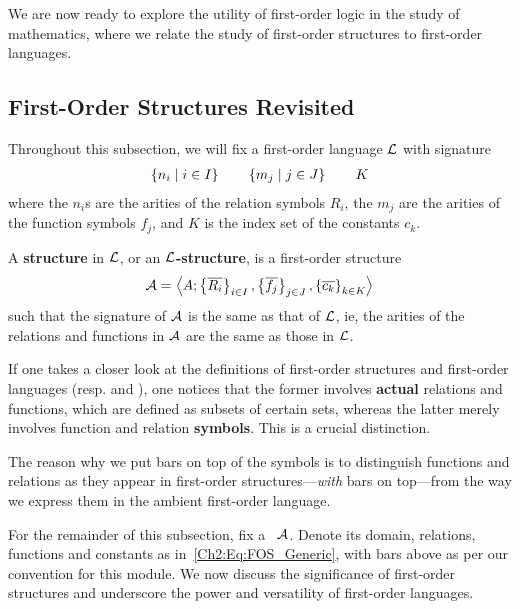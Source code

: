 We are now ready to explore the utility of first-order logic in the study of mathematics, where we relate the study of first-order structures to first-order languages.

\subsection{First-Order Structures Revisited}

Throughout this subsection, we will fix a first-order language $\mathcal{L}$ with signature
\begin{align*}
    \left\{ n_i \; \middle\vert \; i \in I \right\}
    \qquad
    \left\{ m_j \; \middle\vert \; j \in J \right\}
    \qquad
    K
\end{align*}
where the $n_i$s are the arities of the relation symbols $R_i$, the $m_j$ are the arities of the function symbols $f_j$, and $K$ is the index set of the constants $c_k$.

\begin{boxdefinition}\label{Ch2:Def:First-Order_Structure_in_First-Order_Language}
    A \textbf{structure} in $\mathcal{L}$, or an \textbf{$\mathcal{L}$-structure}, is a first-order structure
    \begin{align}
        \mathcal{A} = \left\langle A; \left\{ \overline{R_i} \right\}_{i \in I}, \left\{ \overline{f_j} \right\}_{j \in J}, \left\{ \overline{c_k} \right\}_{k \in K} \right\rangle
        \label{Ch2:Eq:FOS_Generic}
    \end{align}
    such that the signature of $\mathcal{A}$ is the same as that of $\mathcal{L}$, ie, the arities of the relations and functions in $\mathcal{A}$ are the same as those in $\mathcal{L}$.
\end{boxdefinition}

If one takes a closer look at the definitions of first-order structures and first-order languages (resp.  and ), one notices that the former involves \textbf{actual} relations and functions, which are defined as subsets of certain sets, whereas the latter merely involves function and relation \textbf{symbols}. This is a crucial distinction.

\begin{boxconvention}
    The reason why we put bars on top of the symbols is to distinguish functions and relations as they appear in first-order structures---\textit{with} bars on top---from the way we express them in the ambient first-order language.
\end{boxconvention}

For the remainder of this subsection, fix a \fos\ $\mathcal{A}$. Denote its domain, relations, functions and constants as in~\eqref{Ch2:Eq:FOS_Generic}, with bars above as per our convention for this module. We now discuss the significance of first-order structures and underscore the power and versatility of first-order languages.

